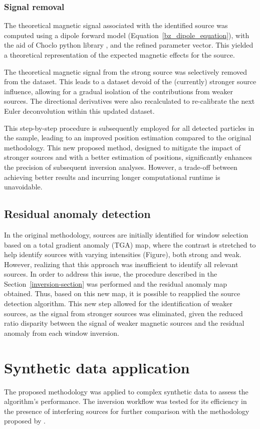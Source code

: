 \subsubsection{Signal removal} 
    The theoretical magnetic signal associated with the identified source was computed using a dipole forward model (Equation~\ref{bz_dipole_equation}), with the aid of Choclo python library \citep{choclo2022}, and the refined parameter vector. This yielded a theoretical representation of the expected magnetic effects for the source.

    The theoretical magnetic signal from the strong source was selectively removed from the dataset. This leads to a dataset devoid of the (currently) stronger source influence, allowing for a gradual isolation of the contributions from weaker sources. The directional derivatives were also recalculated to re-calibrate the next Euler deconvolution within this updated dataset.

    This step-by-step procedure is subsequently employed for all detected particles in the sample, leading to an improved position estimation compared to the original methodology. This new proposed method, designed to mitigate the impact of stronger sources and with a better estimation of positions, significantly enhances the precision of subsequent inversion analyses. However, a trade-off between achieving better results and incurring longer computational runtime is unavoidable.

\subsection{Residual anomaly detection}
    In the original methodology, sources are initially identified for window selection based on a total gradient anomaly (TGA) map, where the contrast is stretched to help identify sources with varying intensities (Figure), both strong and weak. However, realizing that this approach was insufficient to identify all relevant sources. In order to address this issue, the procedure described in the Section~\ref{inversion-section} was performed and the residual anomaly map obtained. Thus, based on this new map, it is possible to reapplied the source detection algorithm. This new step allowed for the identification of weaker sources, as the signal from stronger sources was eliminated, given the reduced ratio disparity between the signal of weaker magnetic sources and the residual anomaly from each window inversion.

\section{Synthetic data application}
The proposed methodology was applied to complex synthetic data to assess the algorithm's performance. The inversion workflow was tested for its efficiency in the presence of interfering sources for further comparison with the methodology proposed by  \citet{Souza-Junior2023b}.

